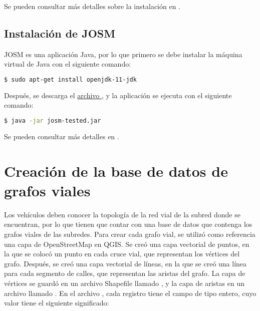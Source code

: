 Se pueden consultar más detalles sobre la instalación en
\cite{InstalacionQGIS}.


\subsection{Instalación de JOSM}

\label{subsec:instalacion_josm}

JOSM es una aplicación Java, por lo que primero se debe instalar la máquina
virtual de Java con el siguiente comando:

\begin{lstlisting}[language=bash]
$ sudo apt-get install openjdk-11-jdk
\end{lstlisting}

Después, se descarga el
\href{https://josm.openstreetmap.de/wiki/Download}{archivo
}, y la aplicación se ejecuta con el siguiente comando:

\begin{lstlisting}[language=bash]
$ java -jar josm-tested.jar
\end{lstlisting}

Se pueden consultar más detalles en \cite{DescargaJOSM}.


\section{Creación de la base de datos de grafos viales}

\label{sec:creacion_base_de_datos_de_grafos_viales}

\begin{sloppypar}
Los vehículos deben conocer la topología de la red vial de la subred donde se
encuentran, por lo que tienen que contar con una base de datos que contenga los
grafos viales de las subredes. Para crear cada grafo vial, se utilizó como
referencia una capa de OpenStreetMap en QGIS. Se creó una capa vectorial de
puntos, en la que se colocó un punto en cada cruce vial, que representan los
vértices del grafo. Después, se creó una capa vectorial de líneas, en la que se
creó una línea para cada segmento de calles, que representan las aristas del
grafo. La capa de vértices se guardó en un archivo Shapefile llamado
, y la capa de aristas en un archivo llamado
. En el archivo , cada registro tiene el
campo  de tipo entero, cuyo valor tiene el siguiente significado:
\end{sloppypar}

